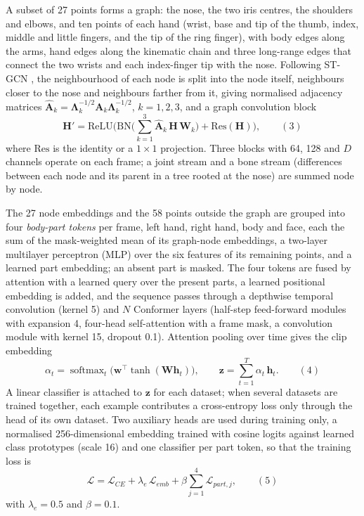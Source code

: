 \documentclass[a4paper,fleqn]{cas-dc}
\begin{document}
A subset of 27 points forms a graph: the nose, the two iris centres, the shoulders and elbows, and ten points of each hand (wrist, base and tip of the thumb, index, middle and little fingers, and the tip of the ring finger), with body edges along the arms, hand edges along the kinematic chain and three long-range edges that connect the two wrists and each index-finger tip with the nose. Following ST-GCN \cite{2018_yan_stgcn}, the neighbourhood of each node is split into the node itself, neighbours closer to the nose and neighbours farther from it, giving normalised adjacency matrices \(\widehat{\mathbf{A}}_{k} = \mathbf{\Lambda}_{k}^{-1/2}\mathbf{A}_{k}\mathbf{\Lambda}_{k}^{-1/2}\), \(k = 1, 2, 3\), and a graph convolution block \[\mathbf{H}' = \mathrm{ReLU}\Big(\mathrm{BN}\Big(\sum_{k=1}^{3}\widehat{\mathbf{A}}_{k}\,\mathbf{H}\,\mathbf{W}_{k}\Big) + \mathrm{Res}(\mathbf{H})\Big),\qquad(3)\] where \(\mathrm{Res}\) is the identity or a \(1 \times 1\) projection. Three blocks with 64, 128 and \(D\) channels operate on each frame; a joint stream and a bone stream (differences between each node and its parent in a tree rooted at the nose) are summed node by node.

The 27 node embeddings and the 58 points outside the graph are grouped into four \emph{body-part tokens} per frame, left hand, right hand, body and face, each the sum of the mask-weighted mean of its graph-node embeddings, a two-layer multilayer perceptron (MLP) over the six features of its remaining points, and a learned part embedding; an absent part is masked. The four tokens are fused by attention with a learned query over the present parts, a learned positional embedding is added, and the sequence passes through a depthwise temporal convolution (kernel 5) and \(N\) Conformer layers \cite{2020_gulati_conformer} (half-step feed-forward modules with expansion 4, four-head self-attention with a frame mask, a convolution module with kernel 15, dropout 0.1). Attention pooling over time gives the clip embedding \[\alpha_{t} = \operatorname{softmax}_{t}\big(\mathbf{w}^{\top}\tanh(\mathbf{W}\mathbf{h}_{t})\big),\qquad \mathbf{z} = \sum_{t=1}^{T}\alpha_{t}\,\mathbf{h}_{t}.\qquad(4)\] A linear classifier is attached to \(\mathbf{z}\) for each dataset; when several datasets are trained together, each example contributes a cross-entropy loss only through the head of its own dataset. Two auxiliary heads are used during training only, a normalised 256-dimensional embedding trained with cosine logits against learned class prototypes (scale 16) and one classifier per part token, so that the training loss is \[\mathcal{L} = \mathcal{L}_{CE} + \lambda_{e}\,\mathcal{L}_{emb} + \beta\sum_{j=1}^{4}\mathcal{L}_{part,j},\qquad(5)\] with \(\lambda_e = 0.5\) and \(\beta = 0.1\).
\end{document}
